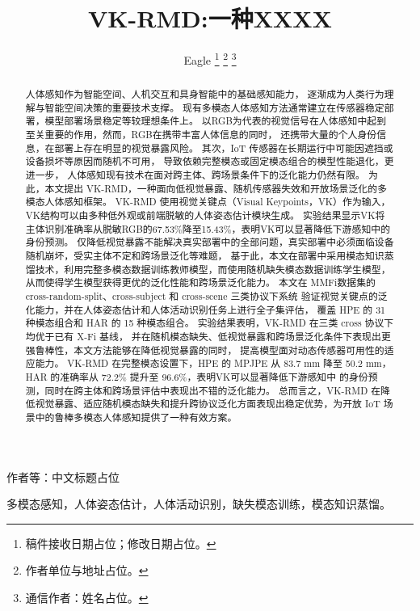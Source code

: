 \documentclass[journal]{IEEEtran}
\begin{document}
\title{VK-RMD:一种XXXX}

\author{Eagle%
\thanks{稿件接收日期占位；修改日期占位。}
\thanks{作者单位与地址占位。}
\thanks{通信作者：姓名占位。}}

%
{作者等：中文标题占位}

\maketitle

\begin{abstract}
人体感知作为智能空间、人机交互和具身智能中的基础感知能力，
逐渐成为人类行为理解与智能空间决策的重要技术支撑。
现有多模态人体感知方法通常建立在传感器稳定部署，模型部署场景稳定等较理想条件上。
以RGB为代表的视觉信号在人体感知中起到至关重要的作用，然而，RGB在携带丰富人体信息的同时，
还携带大量的个人身份信息，在部署上存在明显的视觉暴露风险。
其次，IoT 传感器在长期运行中可能因遮挡或设备损坏等原因而随机不可用，
导致依赖完整模态或固定模态组合的模型性能退化，更进一步，
人体感知现有技术在面对跨主体、跨场景条件下的泛化能力仍然有限。
为此，本文提出 VK-RMD，一种面向低视觉暴露、随机传感器失效和开放场景泛化的多模态人体感知框架。
VK-RMD 使用视觉关键点（Visual Keypoints，VK）作为输入，
VK结构可以由多种低外观或前端脱敏的人体姿态估计模块生成。
实验结果显示VK将主体识别准确率从脱敏RGB的67.53\%降至15.43\%，表明VK可以显著降低下游感知中的身份预测。
仅降低视觉暴露不能解决真实部署中的全部问题，真实部署中必须面临设备随机崩坏，受实主体不定和跨场景泛化等难题，
基于此，本文在部署中采用模态知识蒸馏技术，利用完整多模态数据训练教师模型，而使用随机缺失模态数据训练学生模型，
从而使得学生模型获得更优的泛化性能和跨场景泛化能力。
本文在 MMFi数据集的 cross-random-split、cross-subject 和 cross-scene 三类协议下系统
验证视觉关键点的泛化能力，并在人体姿态估计和人体活动识别任务上进行全子集评估，
覆盖 HPE 的 31 种模态组合和 HAR 的 15 种模态组合。
实验结果表明，VK-RMD 在三类 cross 协议下均优于已有 X-Fi 基线， 
并在随机模态缺失、低视觉暴露和跨场景泛化条件下表现出更强鲁棒性，本文方法能够在降低视觉暴露的同时，
提高模型面对动态传感器可用性的适应能力。
VK-RMD 在完整模态设置下，HPE 的 MPJPE 从 83.7 mm 降至 50.2 mm，HAR 的准确率从 72.2\% 提升至 96.6\%，表明VK可以显著降低下游感知中
的身份预测，同时在跨主体和跨场景评估中表现出不错的泛化能力。
总而言之，VK-RMD 在降低视觉暴露、适应随机模态缺失和提升跨协议泛化方面表现出稳定优势，为开放 IoT 场景中的鲁棒多模态人体感知提供了一种有效方案。
\end{abstract}
    
\begin{IEEEkeywords}
多模态感知，人体姿态估计，人体活动识别，缺失模态训练，模态知识蒸馏。
\end{IEEEkeywords}
\end{document}
